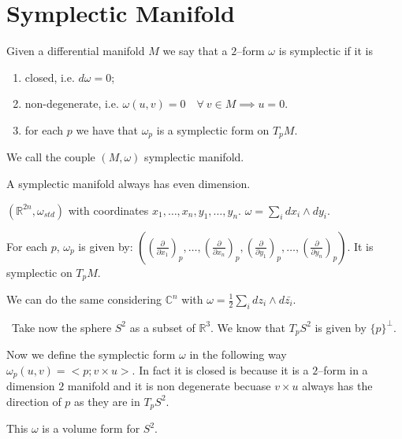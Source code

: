 \documentclass[misc]{subfiles}
\begin{document}
 

\section*{Symplectic Manifold}

\begin{Dfn}
    Given a differential manifold $M$ we say that a $2$--form $\omega$ is symplectic if it is
    \begin{enumerate}[label=\DfnLbl]

        \item closed, i.e. $d\omega=0$;

        \item non-degenerate, i.e. $\omega(u,v)=0 \quad \forall \ v\in M \implies u=0$.

        \item for each $p$ we have that $\omega_p$ is a symplectic form on $T_pM$.
    \end{enumerate}

    We call the couple $(M,\omega)$ symplectic manifold.
\end{Dfn}

\begin{Prp}
    A symplectic manifold always has even dimension.
\end{Prp}

\begin{Exp}
    $(\mathbb{R}^{2n},\omega_{std})$ with coordinates $x_1,\dots,x_n,y_1,\dots,y_n$. $\omega=\sum_i dx_i \wedge dy_i$.

    For each $p$, $\omega_p$ is given by: $\left( (\frac{\partial}{\partial x_1})_p, \dots, (\frac{\partial}{\partial x_n})_p, (\frac{\partial}{\partial y_1})_p, \dots, (\frac{\partial}{\partial y_n})_p\right)$. It is symplectic on $T_pM$.

    We can do the same considering $\mathbb{C}^n$ with $\omega=\frac{1}{2} \sum_i dz_i \wedge d\bar{z_i}$.
\end{Exp}

\begin{Exp}\
    Take now the sphere $S^2$ as a subset of $\mathbb{R}^3$. We know that $T_pS^2$ is given by $\{p\}^\perp$.

    Now we define the symplectic form $\omega$ in the following way $\omega_p(u,v)=<p; v \times u>$. In fact it is closed is because it is a $2$--form in a dimension $2$ manifold and it is non degenerate becuase $v \times u$ always has the direction of $p$ as they are in $T_pS^2$.\

    This $\omega$ is a volume form for $S^2$.
\end{Exp}
\end{document}
